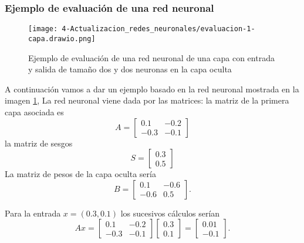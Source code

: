 \subsubsection*{Ejemplo de evaluación de una red neuronal}

\begin{figure}[h!]
    \texttt{[image: 4-Actualizacion\_redes\_neuronales/evaluacion-1-capa.drawio.png]}
    \centering
    \caption{Ejemplo de evaluación de una red neuronal de una capa con entrada y salida de tamaño dos y dos neuronas en la capa oculta}
    \label{img:Ejemplo-evaluación-red-neruonal-una-capa}
\end{figure}

A continuación vamos a dar un ejemplo basado en la red neuronal mostrada en la imagen \ref{img:Ejemplo-evaluación-red-neruonal-una-capa}, 
La red neuronal viene dada por las matrices: 
la matriz de la primera capa asociada es 
\begin{equation}
     A = 
        \begin{bmatrix}
            0.1 & -0.2 \\
            -0.3 & -0.1 
        \end{bmatrix}  
\end{equation}
la matriz de sesgos 
\begin{equation}
    S = 
        \begin{bmatrix}
            0.3  \\
            0.5 
        \end{bmatrix}  
\end{equation}
La matriz de pesos de la capa oculta sería 
\begin{equation}
     B = 
    \begin{bmatrix}
        0.1 & -0.6 \\
        -0.6 & 0.5
    \end{bmatrix}. 
\end{equation}

Para la entrada  $x = (0.3, 0.1)$ los sucesivos cálculos serían
\begin{equation}
    A x = 
    \begin{bmatrix}
        0.1 & -0.2 \\
        -0.3 & -0.1 
    \end{bmatrix}  
    \begin{bmatrix}
        0.3  \\
        0.1 
    \end{bmatrix}
    = 
    \begin{bmatrix}
        0.01  \\
        -0.1 
    \end{bmatrix}
    . 
\end{equation}


